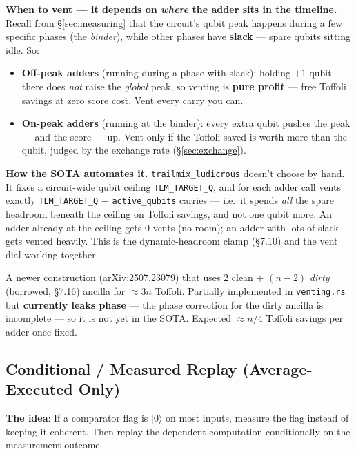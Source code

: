 \documentclass[11pt,a4paper]{article}
\newcommand{\ket}[1]{$|#1\rangle$\xspace}
\newcommand{\tof}{Toffoli\xspace}
\begin{document}
\textbf{When to vent --- it depends on \emph{where} the adder sits in the timeline.} Recall from
\S\ref{sec:measuring} that the circuit's qubit peak happens during a few specific phases (the
\emph{binder}), while other phases have \textbf{slack} --- spare qubits sitting idle. So:
\begin{itemize}
  \item \textbf{Off-peak adders} (running during a phase with slack): holding $+1$ qubit there does
    \emph{not} raise the \emph{global} peak, so venting is \textbf{pure profit} --- free Toffoli
    savings at zero score cost. Vent every carry you can.
  \item \textbf{On-peak adders} (running at the binder): every extra qubit pushes the peak --- and the
    score --- up. Vent only if the Toffoli saved is worth more than the qubit, judged by the exchange
    rate (\S\ref{sec:exchange}).
\end{itemize}

\textbf{How the SOTA automates it.} \texttt{trailmix\_ludicrous} doesn't choose by hand. It fixes a
circuit-wide qubit ceiling \texttt{TLM\_TARGET\_Q}, and for each adder call vents exactly
\texttt{TLM\_TARGET\_Q} $-$ \texttt{active\_qubits} carries --- i.e.\ it spends \emph{all} the spare
headroom beneath the ceiling on Toffoli savings, and not one qubit more. An adder already at the
ceiling gets $0$ vents (no room); an adder with lots of slack gets vented heavily. This is the
dynamic-headroom clamp (\S7.10) and the vent dial working together.

\begin{tcolorbox}[noteboxstyle, title=Gidney 2025 streaming vented adder (open)]
A newer construction (arXiv:2507.23079) that uses 2 clean $+$ $(n-2)$ \emph{dirty} (borrowed,
\S7.16) ancilla for $\approx 3n$ Toffoli. Partially implemented in \texttt{venting.rs} but
\textbf{currently leaks phase} --- the phase correction for the dirty ancilla is incomplete --- so it
is not yet in the SOTA. Expected $\approx n/4$ \tof savings per adder once fixed.
\end{tcolorbox}

\subsection{Conditional / Measured Replay (Average-Executed Only)}
\label{sec:replay}

\textbf{The idea}: If a comparator flag is \ket{0} on most inputs, measure the flag instead of
keeping it coherent. Then replay the dependent computation conditionally on the measurement outcome.
\end{document}
